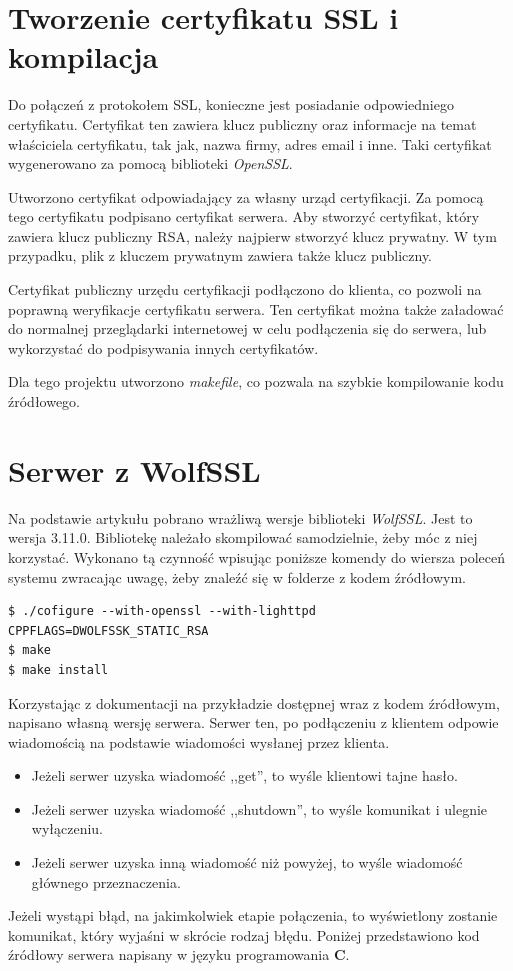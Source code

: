 \documentclass[12pt,twoside,a4]{mwbk}
\theoremstyle{definition}
\begin{document}
\section{Tworzenie certyfikatu SSL i kompilacja}
Do połączeń z protokołem SSL, konieczne jest posiadanie odpowiedniego certyfikatu. Certyfikat ten zawiera klucz publiczny oraz informacje na temat właściciela certyfikatu, tak jak, nazwa firmy, adres email i inne. Taki certyfikat wygenerowano za pomocą biblioteki \textit{OpenSSL}. \\ \par
Utworzono certyfikat odpowiadający za własny urząd certyfikacji. Za pomocą tego certyfikatu podpisano certyfikat serwera. Aby stworzyć certyfikat, który zawiera klucz publiczny RSA, należy najpierw stworzyć klucz prywatny. W tym przypadku, plik z kluczem prywatnym zawiera także klucz publiczny. \\ \par
Certyfikat publiczny urzędu certyfikacji podłączono do klienta, co pozwoli na poprawną weryfikacje certyfikatu serwera. Ten certyfikat można także załadować do normalnej przeglądarki internetowej w celu podłączenia się do serwera, lub wykorzystać do podpisywania innych certyfikatów. \\ \par
Dla tego projektu utworzono \textit{makefile}, co pozwala na szybkie kompilowanie kodu źródłowego.

\section{Serwer z WolfSSL}
Na podstawie artykułu \cite{robot} pobrano wrażliwą wersje biblioteki \textit{WolfSSL}. Jest to wersja 3.11.0. Bibliotekę należało skompilować samodzielnie, żeby móc z niej korzystać. Wykonano tą czynność wpisując poniższe komendy do wiersza poleceń systemu zwracając uwagę, żeby znaleźć się w folderze z kodem źródłowym.
\begin{lstlisting}
$ ./cofigure --with-openssl --with-lighttpd CPPFLAGS=DWOLFSSK_STATIC_RSA
$ make
$ make install
\end{lstlisting}
Korzystając z dokumentacji na przykładzie dostępnej wraz z kodem źródłowym, napisano własną wersję serwera. Serwer ten, po podłączeniu z klientem odpowie wiadomością na podstawie wiadomości wysłanej przez klienta.
\begin{itemize}
\item Jeżeli serwer uzyska wiadomość ,,get'', to wyśle klientowi tajne hasło.
\item Jeżeli serwer uzyska wiadomość ,,shutdown'', to wyśle komunikat i ulegnie wyłączeniu.
\item Jeżeli serwer uzyska inną wiadomość niż powyżej, to wyśle wiadomość głównego przeznaczenia.
\end{itemize}
Jeżeli wystąpi błąd, na jakimkolwiek etapie połączenia, to wyświetlony zostanie komunikat, który wyjaśni w skrócie rodzaj błędu. Poniżej przedstawiono kod źródłowy serwera napisany w języku programowania \textbf{C}.
\end{document}
